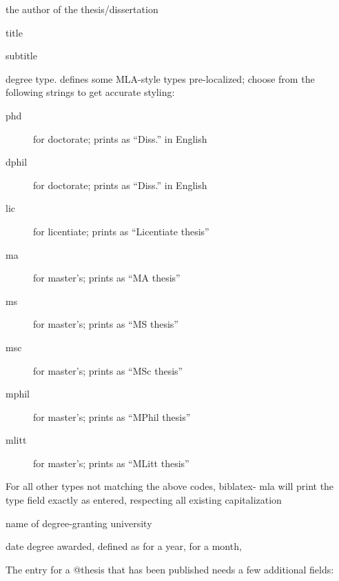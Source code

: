\documentclass{ltxdockit}
\newcommand*{\Biblatexmla}{\sty{Biblatex-mla}\xspace}
\newenvironment*{optionslistNOT}
  {\list{}{%
     \setlength{\labelwidth}{\marglistwidth}%
     \setlength{\labelsep}{\marglistsep}%
     \setlength{\leftmargin}{50pt}%
     \renewcommand*{\makelabel}[1]{\hss\marglistfont##1}}%
   \def\optionitem##1{%
     \item[{\textbf{##1}}]}}
  {\endlist}
\begin{document}
\begin{optionslistNOT}

	\optionitem{author}
	
	the author of the thesis/dissertation
	
	\optionitem{title}
	
	title
	
	\optionitem{subtitle}
	
	subtitle
	
	\optionitem{type}
	
	degree type. \Biblatexmla defines some MLA-style  types pre-localized; choose from the following strings to get accurate styling:
	\begin{description}
		\item[phd] for doctorate; prints as ``Diss.'' in English
		\item[dphil] for doctorate; prints as ``Diss.'' in English
		\item[lic] for licentiate; prints as ``Licentiate thesis''
		\item[ma] for master's; prints as ``MA thesis''
		\item[ms] for master's; prints as ``MS thesis''
		\item[msc] for master's; prints as ``MSc thesis''
		\item[mphil] for master's; prints as ``MPhil thesis''
		\item[mlitt] for master's; prints as ``MLitt thesis''
	\end{description}
	
	For all other types not matching the above codes, biblatex- mla will print the type field exactly as entered, respecting all existing capitalization
	
	\optionitem{institution}
	
	name of degree-granting university
	
	\optionitem{date}
	
	date degree awarded, defined as  for a year,  for a month, 

\end{optionslistNOT}

The entry for a @thesis that has been published needs a few additional fields:
\end{document}
